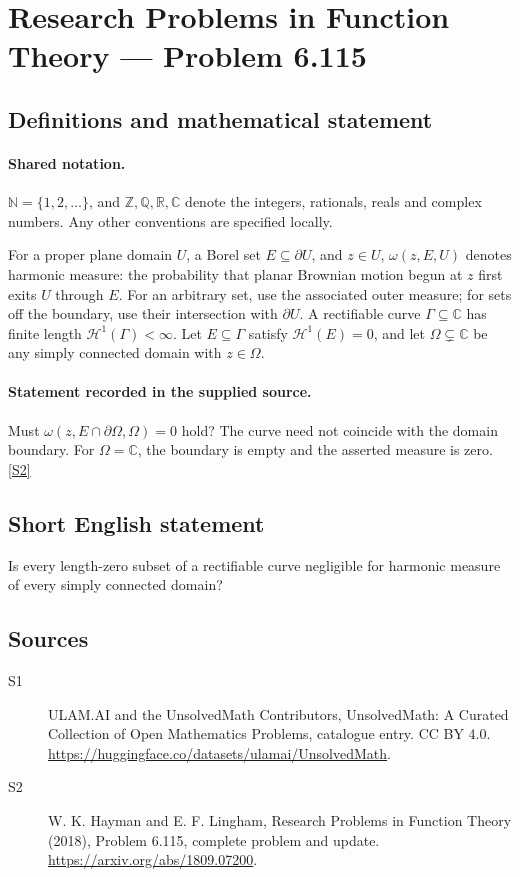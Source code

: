 \documentclass[11pt]{article}
\newcommand{\sref}[2]{\hyperlink{source:#1:#2}{[S#2]}}
\begin{document}
\section{Research Problems in Function Theory — Problem 6.115}\label{statement}

\subsection{Definitions and mathematical statement}

\paragraph{Shared notation.}$\mathbb N=\{1,2,\ldots\}$, and $\mathbb Z,\mathbb Q,\mathbb R,\mathbb C$ denote the integers, rationals, reals and complex numbers. Any other conventions are specified locally.


For a proper plane domain $U$, a Borel set $E\subseteq\partial U$, and $z\in U$, $\omega(z,E,U)$ denotes harmonic measure: the probability that planar Brownian motion begun at $z$ first exits $U$ through $E$. For an arbitrary set, use the associated outer measure; for sets off the boundary, use their intersection with $\partial U$.
A rectifiable curve $\Gamma\subseteq\mathbb C$ has finite length $\mathcal H^1(\Gamma)<\infty$. Let $E\subseteq\Gamma$ satisfy $\mathcal H^1(E)=0$, and let $\Omega\subsetneq\mathbb C$ be any simply connected domain with $z\in\Omega$.
\paragraph{Statement recorded in the supplied source.}
Must $\omega(z,E\cap\partial\Omega,\Omega)=0$ hold? The curve need not coincide with the domain boundary. For $\Omega=\mathbb C$, the boundary is empty and the asserted measure is zero. \sref{statement}{2}
\subsection{Short English statement}
Is every length-zero subset of a rectifiable curve negligible for harmonic measure of every simply connected domain?
\subsection{Sources}
\begin{description}
\item[\hypertarget{source:statement:1}{S1}] ULAM.AI and the UnsolvedMath Contributors, UnsolvedMath: A Curated Collection of Open Mathematics Problems, catalogue entry. CC BY 4.0. \url{https://huggingface.co/datasets/ulamai/UnsolvedMath}.
\item[\hypertarget{source:statement:2}{S2}] W. K. Hayman and E. F. Lingham, Research Problems in Function Theory (2018), Problem 6.115, complete problem and update. \url{https://arxiv.org/abs/1809.07200}.
\end{description}
\label{end:statement}
\end{document}
